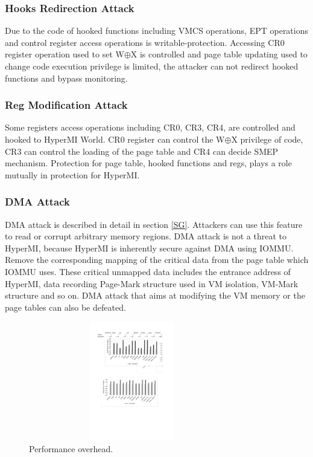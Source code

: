 \documentclass[conference]{IEEEtran}
\begin{document}
\subsubsection{Hooks Redirection Attack}

Due to the code of hooked functions including VMCS operations, EPT operations and control register access operations is writable-protection. Accessing CR0 register operation used to set W$\oplus${X} is controlled and page table updating used to change code execution privilege is limited, the attacker can not redirect hooked functions and bypass monitoring.

\subsubsection{Reg Modification Attack}

Some registers access operations including CR0, CR3, CR4, are controlled and hooked to HyperMI World. CR0 register can control the W$\oplus${X} privilege of code, CR3 can control the loading of the page table and CR4 can decide SMEP mechanism. Protection for page table, hooked functions and regs, plays a role mutually in protection for HyperMI. 

\subsubsection{DMA Attack}

 DMA attack is described in detail in section \ref{SG}. Attackers can use this feature to read or corrupt arbitrary memory regions. DMA attack is not a threat to HyperMI, because HyperMI is inherently secure against DMA using IOMMU. Remove the corresponding mapping of the critical data from the page table which IOMMU uses. These critical unmapped data includes the entrance address of HyperMI, data recording Page-Mark structure used in VM isolation, VM-Mark structure and so on. DMA attack that aims at modifying the VM memory or the page tables can also be defeated.

\begin{figure}
\centerline{\includegraphics[width=9cm,height=5.2cm]{performance.pdf}}
\caption{Performance overhead.} \label{fig5}
\end{figure}
\end{document}
